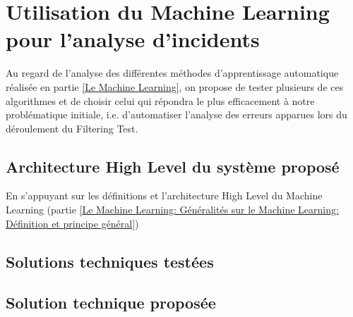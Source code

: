 \chapter{Utilisation du Machine Learning pour l'analyse d'incidents}
\label{Utilisation du Machine Learning pour l'analyse d'incidents}
\thispagestyle{fancy}

Au regard de l'analyse des différentes méthodes d'apprentissage automatique réalisée en partie \ref{Le Machine Learning}, on propose de tester plusieurs de ces algorithmes et de choisir celui qui répondra le plus efficacement à notre problématique initiale, i.e. d'automatiser l'analyse des erreurs apparues lors du déroulement du Filtering Test.

\section{Architecture High Level du système proposé}
\label{Utilisation du Machine Learning pour l'analyse d'incidents: Achitecture High Level du système proposé}
En s'appuyant sur les définitions et l'architecture High Level du Machine Learning (partie \ref{Le Machine Learning: Généralités sur le Machine Learning: Définition et principe général})
\section{Solutions techniques testées}
\label{Utilisation du Machine Learning pour l'analyse d'incidents: Solutions techniques testées}

\section{Solution technique proposée}
\label{Utilisation du Machine Learning pour l'analyse d'incidents: Solution technique proposée}

